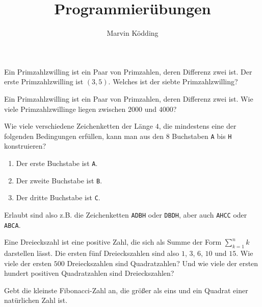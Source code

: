 \documentclass[a4paper, 12pt]{mksheetphhd}
\title{Programmierübungen}
\author{Marvin Ködding}
\begin{document}
	\printtitle
	
	\vspace*{.5cm}
	
	\begin{aufgabe}
		Ein Primzahlzwilling ist ein Paar von Primzahlen, deren Differenz zwei ist. Der erste Primzahlzwilling
		ist $(3, 5)$. Welches ist der siebte Primzahlzwilling?
	\end{aufgabe}
	
	\begin{aufgabe}
		Ein Primzahlzwilling ist ein Paar von Primzahlen, deren Differenz zwei ist. Wie viele Primzahlzwillinge
		liegen zwischen $2000$ und $4000$?
	\end{aufgabe}
	
	\begin{aufgabe}
		Wie viele verschiedene Zeichenketten der Länge $4$, die mindestens eine der folgenden Bedingungen erfüllen, kann man aus den $8$ Buchstaben \texttt{A} bis \texttt{H} konstruieren?
		\begin{enumerate}
			\item Der erste Buchstabe ist \texttt{A}.
			\item Der zweite Buchstabe ist \texttt{B}.
			\item Der dritte Buchstabe ist \texttt{C}.
		\end{enumerate}
		Erlaubt sind also z.B. die Zeichenketten \texttt{ADBH} oder \texttt{DBDH}, aber auch \texttt{AHCC} oder \texttt{ABCA}.
	\end{aufgabe}
	
	\begin{aufgabe}
		Eine Dreieckszahl ist eine positive Zahl, die sich als Summe der Form $\sum_{k=1}^n k$ darstellen lässt. Die ersten fünf Dreieckszahlen sind also $1$, $3$, $6$, $10$ und $15$. Wie viele der ersten $500$ Dreieckszahlen sind Quadratzahlen? Und wie viele der ersten hundert positiven Quadratzahlen sind Dreieckszahlen?
	\end{aufgabe}
	
	\begin{aufgabe}
		Gebt die kleinste Fibonacci-Zahl an, die größer als eins und ein Quadrat einer natürlichen Zahl ist.
	\end{aufgabe}
	
	\printlicense
	
	\printsocials
	
\end{document}
